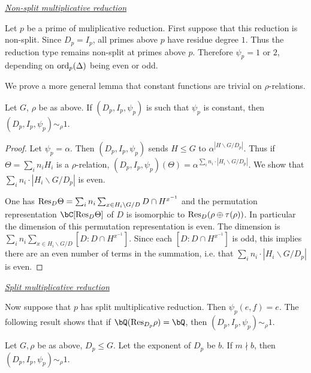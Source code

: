 \noindent\underline{\textit{Non-split multiplicative reduction}}

Let $p$ be a prime of muliplicative reduction. First suppose that this reduction is non-split. Since $D_p = I_p$, all primes above $p$ have residue degree $1$. Thus the reduction type remains non-split at primes above $p$. Therefore $\psi_p = 1$ or $2$, depending on $\mathrm{ord}_p(\Delta)$ being even or odd. 

We prove a more general lemma that constant functions are trivial on $\rho$-relations.

\begin{lemma}
Let $G$, $\rho$ be as above. If $(D_p, I_p, \psi_p)$ is such that $\psi_p$ is constant, then $(D_p, I_p, \psi_p) \sim_{\rho} 1$.  
\end{lemma}   

\begin{proof}
    Let $\psi_p = \alpha$. Then $(D_p, I_p, \psi_p)$ sends $H \leq G$ to $\alpha^{| H \backslash G / D_p|}$. Thus if $\Theta = \sum_i n_i H_i$ is a $\rho$-relation, $(D_p, I_p, \psi_p)(\Theta) = \alpha^{ \sum_i n_i \cdot | H_i \backslash G / D_p|}$. We show that $\sum_i n_i \cdot | H_i \backslash G / D_p|$ is even. 

    One has $\mathrm{Res}_D \Theta = \sum_i n_i \sum_{x \in H_i \backslash G / D} D \cap H^{x^{-1}}$ and the permutation representation $\bC[\Res_D \Theta]$ of $D$ is isomorphic to $\mathrm{Res}_D (\rho \oplus \tau(\rho))$. In particular the dimension of this permutation representation is even. The dimension is $\sum_i n_i \sum_{x \in H_i \backslash G / D} [D \colon D \cap H^{x^{-1}} ]$. Since each $[D \colon D \cap H^{x^{-1}} ]$ is odd, this implies there are an even number of terms in the summation, i.e. that $\sum_i n_i \cdot | H_i \backslash G / D_p|$ is even. 
    
\end{proof}

\noindent\underline{\textit{Split multiplicative reduction}}

Now suppose that $p$ has split multiplicative reduction. Then $\psi_p(e, f) = e$.
The following result shows that if $\bQ(\Res_{D_p}\rho ) = \bQ$, then $(D_p, I_p, \psi_p) \sim_{\rho} 1$.

\begin{lemma}\label{rational-res}
    Let $G, \rho$ be as above, $D_p \leq G$. Let the exponent of $D_p$ be $b$. If $m \nmid b$, then $(D_p, I_p, \psi_p) \sim_{\rho} 1$. 
\end{lemma}

